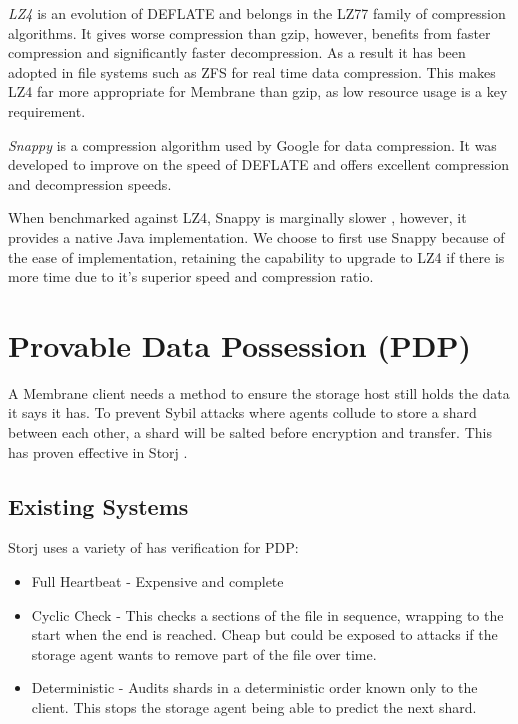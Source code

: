 \documentclass[11pt, a4paper, twoside]{report}
\begin{document}
\emph{LZ4} is an evolution of DEFLATE and belongs in the LZ77 family of compression algorithms. It gives worse compression than gzip, however, benefits from faster compression and significantly faster decompression. \citep{legesse2014performance} As a result it has been adopted in file systems such as ZFS for real time data compression. This makes LZ4 far more appropriate for Membrane than gzip, as low resource usage is a key requirement.

\emph{Snappy} is a compression algorithm used by Google for data compression. It was developed to improve on the speed of DEFLATE and offers excellent compression and decompression speeds. \citep{google2017snappy}

When benchmarked against LZ4, Snappy is marginally slower \citep{vorontsov2015compression}, however, it provides a native Java implementation. We choose to first use Snappy because of the ease of implementation, retaining the capability to upgrade to LZ4 if there is more time due to it's superior speed and compression ratio. \citep{lz42017lz4}

\section{Provable Data Possession (PDP)} \label{sec:poo}

A Membrane client needs a method to ensure the storage host still holds the data it says it has. To prevent Sybil attacks where agents collude to store a shard between each other, a shard will be salted before encryption and transfer. This has proven effective in Storj \citep{Wilkinson14storja}.

\subsection{Existing Systems}

Storj uses a variety of has verification for PDP:

\begin{itemize}
 \item Full Heartbeat - Expensive and complete
 \item Cyclic Check - This checks a sections of the file in sequence, wrapping to the start when the end is reached. Cheap but could be exposed to attacks if the storage agent wants to remove part of the file over time.
 \item Deterministic - Audits shards in a deterministic order known only to the client. This stops the storage agent being able to predict the next shard.
\end{itemize}
\end{document}
